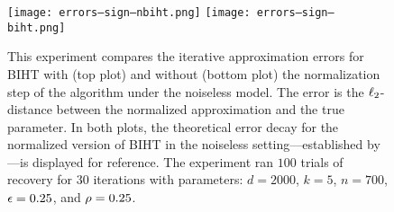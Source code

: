 \begin{figure}
%
%
\texttt{[image: errors--sign--nbiht.png]}
\texttt{[image: errors--sign--biht.png]}
\caption{\label{fig:error-decay-nbiht-biht-comparison-beta=1-plot:sign}
This experiment compares the iterative approximation errors for BIHT with (top plot) and without (bottom plot) the normalization step of the algorithm under the noiseless model.
The error is the \(  \ell_{2}  \)-distance between the normalized approximation and the true parameter.
In both plots, the theoretical error decay for the normalized version of BIHT in the noiseless setting---established by \cite{matsumoto2022binary}---is displayed for reference.
The experiment ran \(  100  \) trials of recovery for \(  30  \) iterations with parameters: \(  d = 2000  \), \(  k = 5  \), \(  n = 700  \), \(  \epsilon = 0.25  \), and \(  \rho = 0.25  \).%
}
%
\end{figure}

